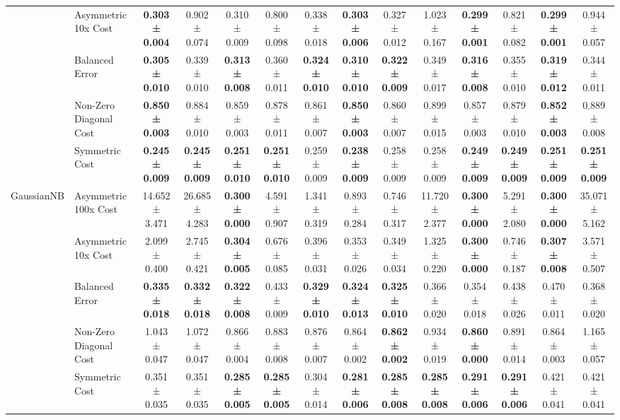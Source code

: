 \begin{table}[H]
{\begin{tabular}{llcccccccccccc}
 & Asymmetric 10x Cost & \textbf{0.303 ± 0.004} & 0.902 ± 0.074 & 0.310 ± 0.009 & 0.800 ± 0.098 & 0.338 ± 0.018 & \textbf{0.303 ± 0.006} & 0.327 ± 0.012 & 1.023 ± 0.167 & \textbf{0.299 ± 0.001} & 0.821 ± 0.082 & \textbf{0.299 ± 0.001} & 0.944 ± 0.057 \\
 & Balanced Error & \textbf{0.305 ± 0.010} & 0.339 ± 0.010 & \textbf{0.313 ± 0.008} & 0.360 ± 0.011 & \textbf{0.324 ± 0.010} & \textbf{0.310 ± 0.010} & \textbf{0.322 ± 0.009} & 0.349 ± 0.017 & \textbf{0.316 ± 0.008} & 0.355 ± 0.010 & \textbf{0.319 ± 0.012} & 0.344 ± 0.011 \\
 & Non-Zero Diagonal Cost & \textbf{0.850 ± 0.003} & 0.884 ± 0.010 & 0.859 ± 0.003 & 0.878 ± 0.011 & 0.861 ± 0.007 & \textbf{0.850 ± 0.003} & 0.860 ± 0.007 & 0.899 ± 0.015 & 0.857 ± 0.003 & 0.879 ± 0.010 & \textbf{0.852 ± 0.003} & 0.889 ± 0.008 \\
 & Symmetric Cost & \textbf{0.245 ± 0.009} & \textbf{0.245 ± 0.009} & \textbf{0.251 ± 0.010} & \textbf{0.251 ± 0.010} & 0.259 ± 0.009 & \textbf{0.238 ± 0.009} & 0.258 ± 0.009 & 0.258 ± 0.009 & \textbf{0.249 ± 0.009} & \textbf{0.249 ± 0.009} & \textbf{0.251 ± 0.009} & \textbf{0.251 ± 0.009} \\
\cline{1-14}
\multirow[t]{5}{*}{GaussianNB} & Asymmetric 100x Cost & 14.652 ± 3.471 & 26.685 ± 4.283 & \textbf{0.300 ± 0.000} & 4.591 ± 0.907 & 1.341 ± 0.319 & 0.893 ± 0.284 & 0.746 ± 0.317 & 11.720 ± 2.377 & \textbf{0.300 ± 0.000} & 5.291 ± 2.080 & \textbf{0.300 ± 0.000} & 35.071 ± 5.162 \\
 & Asymmetric 10x Cost & 2.099 ± 0.400 & 2.745 ± 0.421 & \textbf{0.304 ± 0.005} & 0.676 ± 0.085 & 0.396 ± 0.031 & 0.353 ± 0.026 & 0.349 ± 0.034 & 1.325 ± 0.220 & \textbf{0.300 ± 0.000} & 0.746 ± 0.187 & \textbf{0.307 ± 0.008} & 3.571 ± 0.507 \\
 & Balanced Error & \textbf{0.335 ± 0.018} & \textbf{0.332 ± 0.018} & \textbf{0.322 ± 0.008} & 0.433 ± 0.009 & \textbf{0.329 ± 0.010} & \textbf{0.324 ± 0.013} & \textbf{0.325 ± 0.010} & 0.366 ± 0.020 & 0.354 ± 0.018 & 0.438 ± 0.026 & 0.470 ± 0.011 & 0.368 ± 0.020 \\
 & Non-Zero Diagonal Cost & 1.043 ± 0.047 & 1.072 ± 0.047 & 0.866 ± 0.004 & 0.883 ± 0.008 & 0.876 ± 0.007 & 0.864 ± 0.002 & \textbf{0.862 ± 0.002} & 0.934 ± 0.019 & \textbf{0.860 ± 0.000} & 0.891 ± 0.014 & 0.864 ± 0.003 & 1.165 ± 0.057 \\
 & Symmetric Cost & 0.351 ± 0.035 & 0.351 ± 0.035 & \textbf{0.285 ± 0.005} & \textbf{0.285 ± 0.005} & 0.304 ± 0.014 & \textbf{0.281 ± 0.006} & \textbf{0.285 ± 0.008} & \textbf{0.285 ± 0.008} & \textbf{0.291 ± 0.006} & \textbf{0.291 ± 0.006} & 0.421 ± 0.041 & 0.421 ± 0.041 \\

\end{tabular}}
\end{table}
